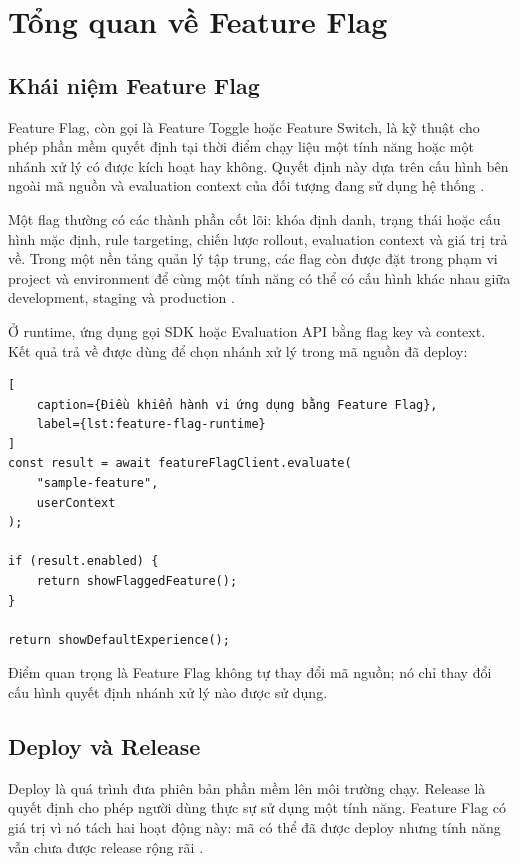 \section{Tổng quan về Feature Flag}

\subsection{Khái niệm Feature Flag}

Feature Flag, còn gọi là Feature Toggle hoặc Feature Switch, là kỹ thuật cho phép phần mềm quyết định tại thời điểm chạy liệu một tính năng hoặc một nhánh xử lý có được kích hoạt hay không. Quyết định này dựa trên cấu hình bên ngoài mã nguồn và evaluation context của đối tượng đang sử dụng hệ thống \cite{fowler_feature_toggles,unleash_feature_flags}.

Một flag thường có các thành phần cốt lõi: khóa định danh, trạng thái hoặc cấu hình mặc định, rule targeting, chiến lược rollout, evaluation context và giá trị trả về. Trong một nền tảng quản lý tập trung, các flag còn được đặt trong phạm vi project và environment để cùng một tính năng có thể có cấu hình khác nhau giữa development, staging và production \cite{launchdarkly_feature_flags}.

Ở runtime, ứng dụng gọi SDK hoặc Evaluation API bằng flag key và context. Kết quả trả về được dùng để chọn nhánh xử lý trong mã nguồn đã deploy:

\begin{lstlisting}[
    caption={Điều khiển hành vi ứng dụng bằng Feature Flag},
    label={lst:feature-flag-runtime}
]
const result = await featureFlagClient.evaluate(
    "sample-feature",
    userContext
);

if (result.enabled) {
    return showFlaggedFeature();
}

return showDefaultExperience();
\end{lstlisting}

Điểm quan trọng là Feature Flag không tự thay đổi mã nguồn; nó chỉ thay đổi cấu hình quyết định nhánh xử lý nào được sử dụng.

\subsection{Deploy và Release}

Deploy là quá trình đưa phiên bản phần mềm lên môi trường chạy. Release là quyết định cho phép người dùng thực sự sử dụng một tính năng. Feature Flag có giá trị vì nó tách hai hoạt động này: mã có thể đã được deploy nhưng tính năng vẫn chưa được release rộng rãi \cite{microsoft_devops}.

